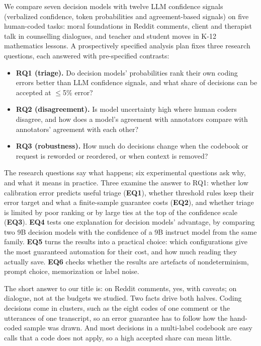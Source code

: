 We compare seven decision models with twelve LLM confidence signals (verbalized confidence, token probabilities and
agreement-based signals) on five human-coded tasks: moral foundations in Reddit comments, client and therapist talk in
counselling dialogues, and teacher and student moves in K-12 mathematics lessons. A prospectively specified analysis plan
fixes three research questions, each answered with pre-specified contrasts:
\begin{itemize}
  \item \textbf{RQ1 (triage).} Do decision models' probabilities rank their own coding errors better than LLM confidence
  signals, and what share of decisions can be accepted at $\le$5\% error?
  \item \textbf{RQ2 (disagreement).} Is model uncertainty high where human coders disagree, and how does a model's agreement
  with annotators compare with annotators' agreement with each other?
  \item \textbf{RQ3 (robustness).} How much do decisions change when the codebook or request is reworded or reordered, or
  when context is removed?
\end{itemize}
The research questions say what happens; six experimental questions ask why, and what it means in practice. Three examine
the answer to RQ1: whether low calibration error predicts useful triage (\textbf{EQ1}), whether threshold rules keep their
error target and what a finite-sample guarantee costs (\textbf{EQ2}), and whether triage is limited by poor ranking or by
large ties at the top of the confidence scale (\textbf{EQ3}). \textbf{EQ4} tests one explanation for decision models'
advantage, by comparing two 9B decision models with the confidence of a 9B instruct model from the same family.
\textbf{EQ5} turns the results into a practical choice: which configurations give the most guaranteed automation for their
cost, and how much reading they actually save. \textbf{EQ6} checks whether the results are artefacts of nondeterminism,
prompt choice, memorization or label noise.

The short answer to our title is: on Reddit comments, yes, with caveats; on dialogue, not at the budgets we studied. Two
facts drive both halves. Coding decisions come in clusters, such as the eight codes of one comment or the utterances of one
transcript, so an error guarantee has to follow how the hand-coded sample was drawn. And most decisions in a multi-label
codebook are easy calls that a code does not apply, so a high accepted share can mean little.

